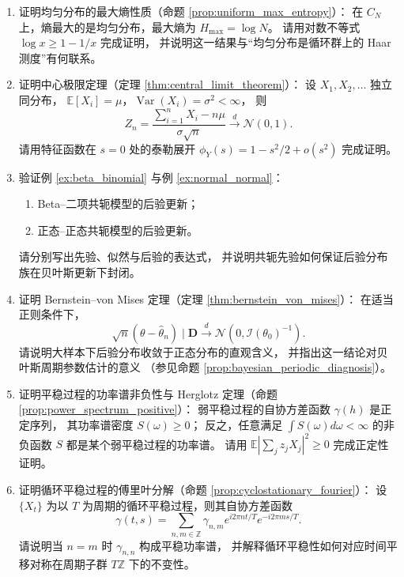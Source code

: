 \begin{enumerate}[leftmargin=3em, label=\textbf{题 \arabic*}]
    \item 证明均匀分布的最大熵性质（命题 \ref{prop:uniform_max_entropy}）：
    在 $C_N$ 上，熵最大的是均匀分布，最大熵为 $H_{\max}=\log N$。
    请用对数不等式 $\log x\ge1-1/x$ 完成证明，
    并说明这一结果与“均匀分布是循环群上的 Haar 测度”有何联系。

    \item 证明中心极限定理（定理 \ref{thm:central_limit_theorem}）：
    设 $X_1,X_2,\dots$ 独立同分布，
    $\mathbb{E}[X_i]=\mu$，$\operatorname{Var}(X_i)=\sigma^2<\infty$，
    则
    \[
    Z_n=\frac{\sum_{i=1}^nX_i-n\mu}{\sigma\sqrt{n}}
    \xrightarrow{d}\mathcal{N}(0,1).
    \]
    请用特征函数在 $s=0$ 处的泰勒展开
    $\phi_Y(s)=1-s^2/2+o(s^2)$ 完成证明。

    \item 验证例 \ref{ex:beta_binomial} 与例 \ref{ex:normal_normal}：
    \begin{enumerate}[label=(\roman*)]
        \item Beta--二项共轭模型的后验更新；
        \item 正态--正态共轭模型的后验更新。
    \end{enumerate}
    请分别写出先验、似然与后验的表达式，
    并说明共轭先验如何保证后验分布族在贝叶斯更新下封闭。

    \item 证明 Bernstein--von Mises 定理（定理 \ref{thm:bernstein_von_mises}）：
    在适当正则条件下，
    \[
    \sqrt{n}(\theta-\hat{\theta}_n)\mid\mathbf{D}
    \xrightarrow{d}\mathcal{N}(0,\mathcal{I}(\theta_0)^{-1}).
    \]
    请说明大样本下后验分布收敛于正态分布的直观含义，
    并指出这一结论对贝叶斯周期参数估计的意义
    （参见命题 \ref{prop:bayesian_periodic_diagnosis}）。

    \item 证明平稳过程的功率谱非负性与 Herglotz 定理（命题 \ref{prop:power_spectrum_positive}）：
    弱平稳过程的自协方差函数 $\gamma(h)$ 是正定序列，
    其功率谱密度 $S(\omega)\ge0$；
    反之，任意满足 $\int S(\omega)d\omega<\infty$ 的非负函数 $S$
    都是某个弱平稳过程的功率谱。
    请用 $\mathbb{E}|\sum_jz_jX_j|^2\ge0$ 完成正定性证明。

    \item 证明循环平稳过程的傅里叶分解（命题 \ref{prop:cyclostationary_fourier}）：
    设 $\{X_t\}$ 为以 $T$ 为周期的循环平稳过程，则其自协方差函数
    \[
    \gamma(t,s)=\sum_{n,m\in\mathbb{Z}}\gamma_{n,m}e^{i2\pi nt/T}e^{-i2\pi ms/T}.
    \]
    请说明当 $n=m$ 时 $\gamma_{n,n}$ 构成平稳功率谱，
    并解释循环平稳性如何对应时间平移对称在周期子群 $T\mathbb{Z}$ 下的不变性。


\end{enumerate}
